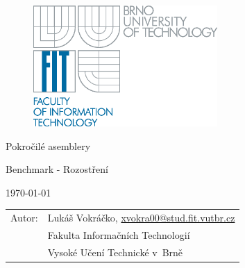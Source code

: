 \begin{titlepage}

\begin{figure}[!h]
\centering
\includegraphics[width=7cm,keepaspectratio]{logo.eps}

\end{figure}

\vfill

\begin{center}
\begin{Huge}
Pokročilé asemblery\\
\end{Huge}
\begin{Large}
Benchmark - Rozostření
\end{Large}
\end{center}

\vfill

\begin{center}
\begin{Large}
\today
\end{Large}
\end{center}

\vfill

\begin{flushleft}
\begin{large}
\begin{tabular}{ll}
Autor: & Lukáš Vokráčko, \url{xvokra00@stud.fit.vutbr.cz} \\
 & Fakulta Informačních Technologií \\
 & Vysoké Učení Technické v~Brně \\
\end{tabular}
\end{large}
\end{flushleft}
\end{titlepage}
